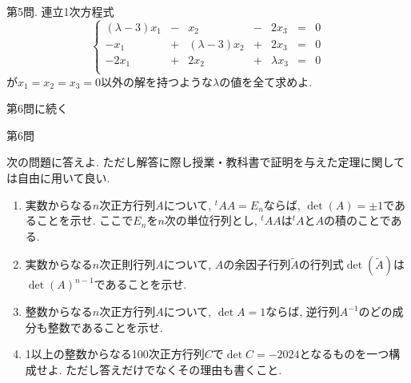 \documentclass[dvipdfmx,a4paper,11pt]{article}
\theoremstyle{definition}
\begin{document}
   \vspace{11pt}
{\Large 第5問.}  連立1次方程式
 $$
 \left\{ 
\begin{matrix}
(\lambda - 3)x_1& -& x_2 &  -& 2x_3&= & 0\\
-x_1&+&(\lambda-3)x_2& +&2x_3&= & 0\\
-2x_1& +&2x_2& + &\lambda x_3&=&0\\
\end{matrix}
\right.
 $$
 が$x_1=x_2=x_3=0$以外の解を持つような$\lambda$の値を全て求めよ.
 
 
\begin{flushright}
\LARGE{第6問に続く}
\end{flushright}

\newpage 

 \vspace{11pt}
{\Large 第6問}  
 
 次の問題に答えよ. ただし解答に際し授業・教科書で証明を与えた定理に関しては自由に用いて良い. 

 \begin{enumerate}
\renewcommand{\labelenumi}{(\arabic{enumi}).}
\item 実数からなる$n$次正方行列$A$について, $^{t}A A=E_n$ならば, $\det (A) = \pm 1$であることを示せ. ここで$E_n$を$n$次の単位行列とし, $^{t}A A$は$^{t}A $と$A$の積のことである.
\item 実数からなる$n$次正則行列$A$について, $A$の余因子行列$\tilde{A}$の行列式$\det(\tilde{A})$は$\det(A)^{n-1}$であることを示せ. 
\item 整数からなる$n$次正方行列$A$について, $\det A=1$ならば, 逆行列$A^{-1}$のどの成分も整数であることを示せ. 
\item 1以上の整数からなる100次正方行列$C$で$\det C=-2024$となるものを一つ構成せよ. ただし答えだけでなくその理由も書くこと.
 \end{enumerate} 
\end{document}
